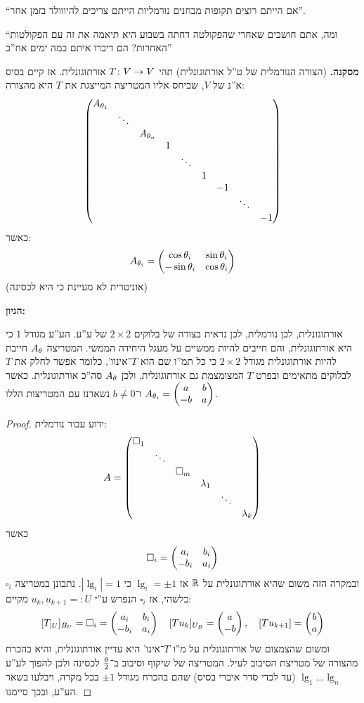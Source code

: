 \documentclass[]{../../../../tex/classes/styledArticle}
\begin{document}
	``אם הייתם רוצים תקופות מבחנים נורמליות הייתם צריכים להיווולד בזמן אחר''. 
	
	``ומה, אתם חושבים שאחרי שהפקולטה דחתה בשבוע היא תיאמה את זה עם הפקולטות האחרות? הם דיברו איתם כמה ימים אח''כ''
	
	\textbf{מסקנה. }(הצורה הנורמלית של ט''ל אורתוגונלית) תהי $T \colon V \to V$ אורתוגונלית. אז קיים בסיס א''נ של $V$, שביחס אליו המטריצה המייצגת את $T$ היא מהצורה: 
	\[ \begin{pmatrix} A_{\theta_1} \\ &\ddots \\ &&A_{\theta_n} \\ &&& 1 \\ &&&&\ddots \\ &&&&&1 \\ &&&&&&-1 \\ &&&&&&& \ddots \\ &&&&&&&&-1 \end{pmatrix} \]
	כאשר: 
	\[ A_{\theta_i} = \begin{pmatrix} \cos \theta_i & \sin \theta_i \\ -\sin \theta_i & \cos \theta_i \end{pmatrix} \]
	(אוניטרית לא מעיינת כי היא לכסינה)
	
	\textbf{הגיון: }
	
		אורתוגונלית, לכן נורמלית, לכן נראית בצורה של בלוקים $2 \times 2$ של ע''ע. הע''ע מגודל $1$ כי היא אורתוגונלית, והם חייבים להיות ממשיים על מעגל היחידה הממשי. המטריצה $A_{\theta}$ חייבת להיות אורתוגונלית מגודל $2 \times 2$ כי כל תמ''ו שם הוא $T$־אינוו', כלומר אפשר לחלק את $T$ לבלוקים מתאימים ובפרט $T$ המצומצמת גם אורתוגונלית, ולכן $A_{\theta}$ סה''כ אורתוגונלית. כאשר $A_{\theta_i} = \begin{pmatrix} a & b \\ -b & a \end{pmatrix}$ ו־$b \neq 0$ נשארנו עם המטריצות הללו. 
	
	
	\begin{proof}
		ידוע עבור נורמלית: 
		\[ A = \begin{pmatrix} \square_1 \\ & \ddots \\ &&\square_m \\ &&& \lambda_1 \\ &&&&\ddots \\ &&&&&\lambda_k \end{pmatrix} \]
		כאשר
		\[ \square_i = \begin{pmatrix} a_i & b_i \\ -b_i & a_i \end{pmatrix} \]
		ובמקרה הזה משום שהיא אורתוגונלית על $\mathbb{R}$ אז $\lg_i = \pm1$ כי $|\lg_i| = 1$. נתבונן במטריצה $\square_i$ כלשהי, אז $\square_i$ הנפרש ע''י $u_k, u_{k + 1} =: U$ מקיים: 
		\[ [T_{|U}]_{B_U} = \square_i = \begin{pmatrix} a_i & b_i \\ -b_i & a_i \end{pmatrix}\quad [Tu_k]_{U_B} = \begin{pmatrix} a \\ -b \end{pmatrix}, \quad [Tu_{k + 1}] = \begin{pmatrix} b \\ a \end{pmatrix} \]
		ומשום שהצמצום של אורתוגונלית על מ''ו $T$־אינו' היא עדיין אורתוגונלית, והיא בהכרח מהצורה של מטריצת הסיבוב לעיל. המטריצה של שיקוף וסיבוב ב־$\frac{\theta}{2}$ לכסינה ולכן להפוך לע''ע $\lg_1 \dots \lg_n$ (עד לכדי סדר איברי בסיס) שהם בהכרח מגודל $\pm 1$ בכל מקרה, ויבלעו בשאר הע''ע, ובכך סיימנו. 
	\end{proof}
	
\end{document}
